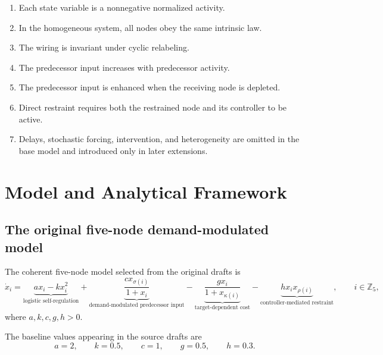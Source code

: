 \documentclass[11pt, reqno]{amsart}
\theoremstyle{definition}
\theoremstyle{remark}
\newcommand{\Z}{\mathbb{Z}}
\begin{document}
	\begin{enumerate}[label=(A\arabic*),leftmargin=3em]
		\item Each state variable is a nonnegative normalized activity.
		\item In the homogeneous system, all nodes obey the same intrinsic law.
		\item The wiring is invariant under cyclic relabeling.
		\item The predecessor input increases with predecessor activity.
		\item The predecessor input is enhanced when the receiving node is
		depleted.
		\item Direct restraint requires both the restrained node and its controller
		to be active.
		\item Delays, stochastic forcing, intervention, and heterogeneity are
		omitted in the base model and introduced only in later extensions.
	\end{enumerate}
	
	\section{Model and Analytical Framework}
	\label{sec:model}
	
	\subsection{The original five-node demand-modulated model}
	
	The coherent five-node model selected from the original drafts is
	\begin{equation}
		\label{eq:five-demand}
		\dot{x}_i
		=
		\underbrace{a x_i-kx_i^2}_{\text{logistic self-regulation}}
		+
		\underbrace{\frac{c x_{\sigma(i)}}{1+x_i}}_{\text{demand-modulated predecessor input}}
		-
		\underbrace{\frac{g x_i}{1+x_{\kappa(i)}}}_{\text{target-dependent cost}}
		-
		\underbrace{h x_i x_{\rho(i)}}_{\text{controller-mediated restraint}},
		\qquad i\in\Z_5,
	\end{equation}
	where $a,k,c,g,h>0$.
	
	The baseline values appearing in the source drafts are
	\begin{equation}
		\label{eq:baseline-parameters}
		a=2,
		\qquad
		k=0.5,
		\qquad
		c=1,
		\qquad
		g=0.5,
		\qquad
		h=0.3.
	\end{equation}
	
\end{document}
